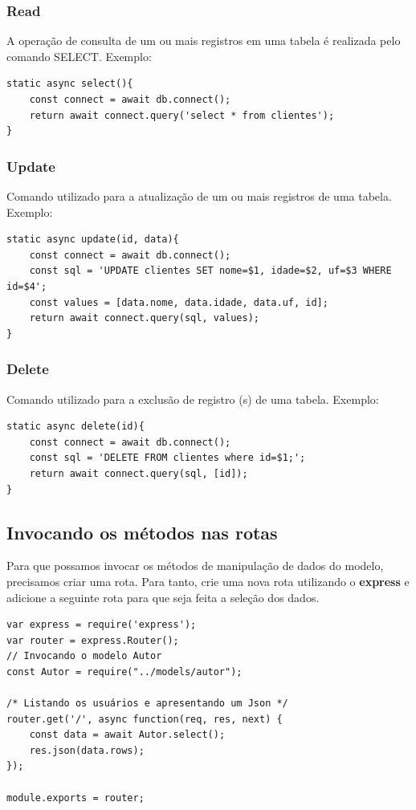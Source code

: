 \subsubsection{Read}

A operação de consulta de um ou mais registros em uma tabela é realizada pelo comando SELECT. Exemplo:

\begin{verbatim}
static async select(){
	const connect = await db.connect();
	return await connect.query('select * from clientes');
}
\end{verbatim}
\subsubsection{Update}

Comando utilizado para a atualização de um ou mais registros de uma tabela. Exemplo:

\begin{verbatim}
static async update(id, data){
	const connect = await db.connect();
	const sql = 'UPDATE clientes SET nome=$1, idade=$2, uf=$3 WHERE id=$4';
	const values = [data.nome, data.idade, data.uf, id];
	return await connect.query(sql, values);
}
\end{verbatim}
\subsubsection{Delete}

Comando utilizado para a exclusão de registro (s) de uma tabela. Exemplo:

\begin{verbatim}
static async delete(id){
	const connect = await db.connect();
	const sql = 'DELETE FROM clientes where id=$1;';
	return await connect.query(sql, [id]);
}
\end{verbatim}

\subsection{Invocando os métodos nas rotas}

Para que possamos invocar os métodos de manipulação de dados do modelo, precisamos criar uma rota. Para tanto, crie uma nova rota utilizando o \textbf{express} e adicione a seguinte rota para que seja feita a seleção dos dados.

\begin{verbatim}
var express = require('express');
var router = express.Router();
// Invocando o modelo Autor
const Autor = require("../models/autor");

/* Listando os usuários e apresentando um Json */
router.get('/', async function(req, res, next) {
	const data = await Autor.select();
	res.json(data.rows);
});

module.exports = router;
\end{verbatim}